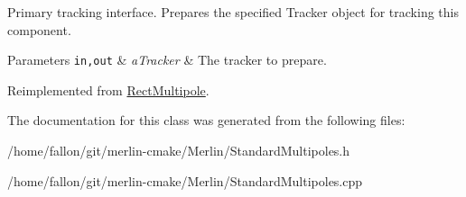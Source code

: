 Primary tracking interface. Prepares the specified Tracker object for tracking this component. 
\begin{DoxyParams}[1]{Parameters}
\mbox{\tt in,out}  & {\em a\+Tracker} & The tracker to prepare. \\
\hline
\end{DoxyParams}


Reimplemented from \hyperlink{classRectMultipole_a2626d08254eee03cffb73abb20a9381a}{Rect\+Multipole}.



The documentation for this class was generated from the following files\+:\begin{DoxyCompactItemize}
\item 
/home/fallon/git/merlin-\/cmake/\+Merlin/Standard\+Multipoles.\+h\item 
/home/fallon/git/merlin-\/cmake/\+Merlin/Standard\+Multipoles.\+cpp\end{DoxyCompactItemize}
